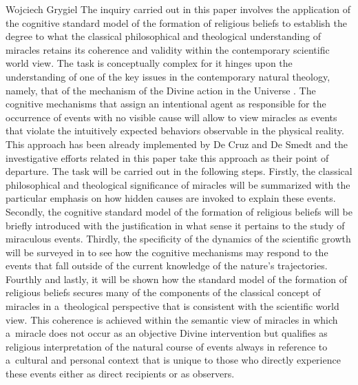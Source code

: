 \begin{artengenv}{Wojciech Grygiel}
The inquiry carried out in this paper involves the application of the cognitive standard model of the formation of religious beliefs to establish the degree to what the classical philosophical and theological understanding of miracles retains its coherence and validity within the contemporary scientific world view. The task is conceptually complex for it hinges upon the understanding of one of the key issues in the contemporary natural theology, namely, that of the mechanism of the Divine action in the Universe
\parencites[e.g.][]{russell_divine_1995}[][]{slomka_gods_2021}. %
 The cognitive mechanisms that assign an intentional agent as responsible for the occurrence of events with no visible cause will allow to view miracles as events that violate the intuitively expected behaviors observable in the physical reality. This approach has been already implemented by De Cruz and De Smedt 
\parencite[][pp.155–178]{de_cruz_natural_2015} %
 and the investigative efforts related in this paper take this approach as their point of departure. The task will be carried out in the following steps. Firstly, the classical philosophical and theological significance of miracles will be summarized with the particular emphasis on how hidden causes are invoked to explain these events. Secondly, the cognitive standard model of the formation of religious beliefs will be briefly introduced with the justification in what sense it pertains to the study of miraculous events. Thirdly, the specificity of the dynamics of the scientific growth will be surveyed in to see how the cognitive mechanisms may respond to the events that fall outside of the current knowledge of the nature’s trajectories. Fourthly and lastly, it will be shown how the standard model of the formation of religious beliefs secures many of the components of the classical concept of miracles in a~theological perspective that is consistent with the scientific world view. This coherence is achieved within the semantic view of miracles in which a~miracle does not occur as an objective Divine intervention but qualifies as religious interpretation of the natural course of events always in reference to a~cultural and personal context that is unique to those who directly experience these events either as direct recipients or as observers.


\end{artengenv}
